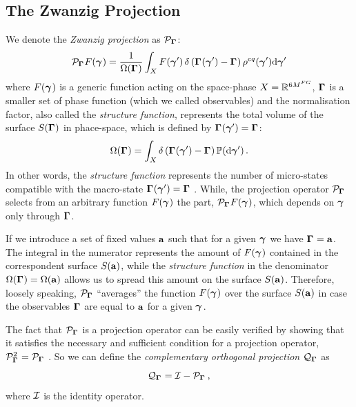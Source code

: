 \documentclass[10pt,a4paper]{book}
\theoremstyle{definition}
\begin{document}
\subsection{The Zwanzig Projection}
We denote the \emph{Zwanzig projection} as $\mathcal{P}_{\boldsymbol\Gamma_{}}$:
\begin{equation}\label{Eq:proj}
	\mathcal{P}_{\boldsymbol\Gamma_{}}F(\boldsymbol\gamma_{}) = \frac{1}{\Omega(\boldsymbol\Gamma_{})} \int_X F(\boldsymbol\gamma_{}')\,\delta\left({\boldsymbol\Gamma_{}(\boldsymbol\gamma_{}')-\boldsymbol\Gamma_{}}\right)\rho^{eq}(\boldsymbol\gamma_{}')\mbox{d}\boldsymbol\gamma_{}'
\end{equation}
where $F(\boldsymbol\gamma_{})$ is a generic function acting on the space-phase $X=\mathbb{R}^{6M^{FG}}$, $\boldsymbol\Gamma_{}$ is a smaller set of phase function (which we called observables) and the normalisation factor, also called the \textit{structure function}, represents the total volume of the surface $S(\boldsymbol\Gamma_{})$ in phace-space, which is defined by $\boldsymbol\Gamma_{}(\boldsymbol\gamma_{}')=\boldsymbol\Gamma_{}$:
%
\begin{equation}\label{eq:structurefunc}
	\Omega(\boldsymbol\Gamma_{}) = \int_X\delta\left({\boldsymbol\Gamma_{}(\boldsymbol\gamma_{}')-\boldsymbol\Gamma_{}}\right)\mathbb{P}(\mbox{d}\boldsymbol\gamma_{}')\,.
\end{equation}
In other words, the \textit{structure function} represents the number of micro-states compatible with the macro-state $\boldsymbol\Gamma_{}(\boldsymbol\gamma_{}')=\boldsymbol\Gamma_{}$ \cite{Hijon2010}. While, the projection operator $\mathcal{P}_{\boldsymbol\Gamma_{}}$ selects from an arbitrary function $F(\boldsymbol\gamma_{})$ the part, $\mathcal{P}_{\boldsymbol\Gamma_{}}F(\boldsymbol\gamma_{})$, which depends on $\boldsymbol\gamma_{}$ only through $\boldsymbol\Gamma_{}$.

\noindent
If we introduce a set of fixed values $\mathbf{a}$ such that for a given $\boldsymbol\gamma_{}$ we have $\boldsymbol\Gamma_{}=\mathbf{a}$. The integral in the numerator represents the amount of $F(\boldsymbol\gamma_{})$ contained in the correspondent surface $S(\mathbf{a})$, while the \textit{structure function} in the denominator $\Omega(\boldsymbol\Gamma_{})=\Omega(\mathbf{a})$ allows us to spread this amount on the surface $S(\mathbf{a})$.
Therefore, loosely speaking, $\mathcal{P}_{\boldsymbol\Gamma_{}}$ ``averages'' the function $F(\boldsymbol\gamma_{})$ over the surface $S(\mathbf{a})$ in case the observables $\boldsymbol\Gamma_{}$ are equal to $\mathbf{a}$ for a given $\boldsymbol\gamma_{}$.

The fact that $\mathcal{P}_{\boldsymbol\Gamma_{}}$ is a projection operator can be easily verified by showing that it satisfies the necessary and
sufficient condition for a projection operator, $\mathcal{P}_{\boldsymbol\Gamma_{}}^2=\mathcal{P}_{\boldsymbol\Gamma_{}}$ \cite{Zwanzig1961}.
So we can define the \emph{complementary orthogonal projection} $\mathcal{Q}_{\boldsymbol\Gamma_{}}$ as
$$
 \mathcal{Q}_{\boldsymbol\Gamma_{}}=\mathcal{I}-\mathcal{P}_{\boldsymbol\Gamma_{}}\,,
$$  
where $\mathcal{I}$ is the identity operator.
\end{document}
